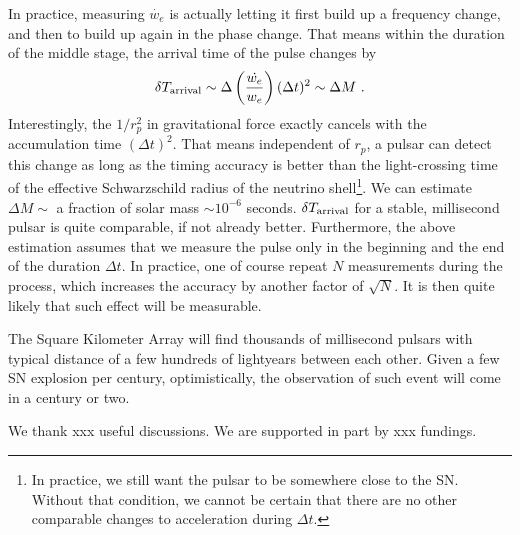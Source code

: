 \documentclass[aps,showpacs,twocolumn,floats,prd,superscriptaddress,nofootinbib]{revtex4-1}
\begin{document}
In practice, measuring $\dot{w_e}$ is actually letting it first build up a frequency change, and then to build up again in the phase change. That means within the duration of the middle stage, the arrival time of the pulse changes by 
\begin{equation}
\delta T_{\rm arrival} \sim \Delta\left(\frac{\dot{w_e}}{w_e}\right)(\Delta t)^2
\sim \Delta M~.
\end{equation}
Interestingly, the $1/r_p^2$ in gravitational force exactly cancels with the accumulation time $(\Delta t)^2$. That means independent of $r_p$, a pulsar can detect this change as long as the timing accuracy is better than the light-crossing time of the effective Schwarzschild radius of the neutrino shell\footnote{In practice, we still want the pulsar to be somewhere close to the SN. Without that condition, we cannot be certain that there are no other comparable changes to acceleration during $\Delta t$.}. We can estimate $\Delta M\sim$ a fraction of solar mass $\sim10^{-6}$ seconds. $\delta T_{\rm arrival}$ for a stable, millisecond pulsar is quite comparable, if not already better\cite{PulsarTiming}. Furthermore, the above estimation assumes that we measure the pulse only in the beginning and the end of the duration $\Delta t$. In practice, one of course repeat $N$ measurements during the process, which increases the accuracy by another factor of $\sqrt{N}$. It is then quite likely that such effect will be measurable.

The Square Kilometer Array\cite{SKA} will find thousands of millisecond pulsars with typical distance of a few hundreds of lightyears between each other. Given a few SN explosion per century\cite{SNrate06}, optimistically, the observation of such event will come in a century or two.

\acknowledgments

We thank xxx useful discussions. We are supported in part by xxx fundings.

\appendix

%

\end{document}
